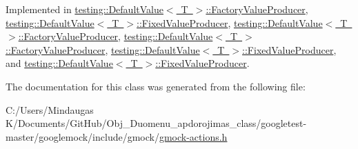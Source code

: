 Implemented in \mbox{\hyperlink{classtesting_1_1_default_value_1_1_factory_value_producer_a246a02412c099b293d905a9749c0fab3}{testing\+::\+Default\+Value$<$ T $>$\+::\+Factory\+Value\+Producer}}, \mbox{\hyperlink{classtesting_1_1_default_value_1_1_fixed_value_producer_ad7f695192e9dbc5f54cdb405655e7125}{testing\+::\+Default\+Value$<$ T $>$\+::\+Fixed\+Value\+Producer}}, \mbox{\hyperlink{classtesting_1_1_default_value_1_1_factory_value_producer_ad669217ac582007bc2e1b08dc13deba5}{testing\+::\+Default\+Value$<$ T $>$\+::\+Factory\+Value\+Producer}}, \mbox{\hyperlink{classtesting_1_1_default_value_1_1_factory_value_producer_ad669217ac582007bc2e1b08dc13deba5}{testing\+::\+Default\+Value$<$ T $>$\+::\+Factory\+Value\+Producer}}, \mbox{\hyperlink{classtesting_1_1_default_value_1_1_fixed_value_producer_a896da438af897dea6a473a11581aac10}{testing\+::\+Default\+Value$<$ T $>$\+::\+Fixed\+Value\+Producer}}, and \mbox{\hyperlink{classtesting_1_1_default_value_1_1_fixed_value_producer_a896da438af897dea6a473a11581aac10}{testing\+::\+Default\+Value$<$ T $>$\+::\+Fixed\+Value\+Producer}}.



The documentation for this class was generated from the following file\+:\begin{DoxyCompactItemize}
\item 
C\+:/\+Users/\+Mindaugas K/\+Documents/\+Git\+Hub/\+Obj\+\_\+\+Duomenu\+\_\+apdorojimas\+\_\+class/googletest-\/master/googlemock/include/gmock/\mbox{\hyperlink{googletest-master_2googlemock_2include_2gmock_2gmock-actions_8h}{gmock-\/actions.\+h}}\end{DoxyCompactItemize}
